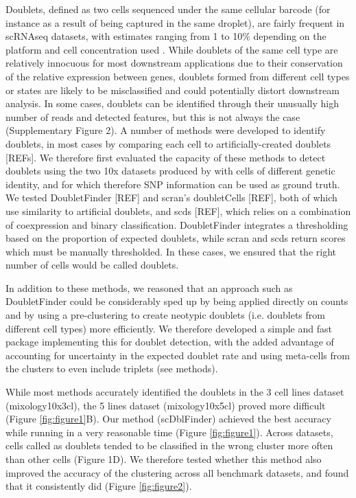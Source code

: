 \documentclass{bmcart}
\begin{document}
Doublets, defined as two cells sequenced under the same cellular barcode (for instance as a result of being captured in the same droplet), are fairly frequent in scRNAseq datasets, with estimates ranging from 1 to 10\% depending on the platform and cell concentration used \citep{bloomEstimating2018,kangMultiplexedDemuxlet2018}. While doublets of the same cell type are relatively innocuous for most downstream applications due to their conservation of the relative expression between genes, doublets formed from different cell types or states are likely to be misclassified and could potentially distort downstream analysis. In some cases, doublets can be identified through their unusually high number of reads and detected features, but this is not always the case (Supplementary Figure 2). A number of methods were developed to identify doublets, in most cases by comparing each cell to artificially-created doublets [REFs]. We therefore first evaluated the capacity of these methods to detect doublets using the two 10x datasets produced by \citep{tianMixology2018} with cells of different genetic identity, and for which therefore SNP information can be used as ground truth. We tested DoubletFinder [REF] and scran's doubletCells [REF], both of which use similarity to artificial doublets, and scds [REF], which relies on a combination of coexpression and binary classification. DoubletFinder integrates a thresholding based on the proportion of expected doublets, while scran and scds return scores which must be manually thresholded. In these cases, we ensured that the right number of cells would be called doublets.

In addition to these methods, we reasoned that an approach such as DoubletFinder could be considerably sped up by being applied directly on counts and by using a pre-clustering to create neotypic doublets (i.e. doublets from different cell types) more efficiently. We therefore developed a simple and fast package implementing this for doublet detection, with the added advantage of accounting for uncertainty in the expected doublet rate and using meta-cells from the clusters to even include triplets (see methods).

While most methods accurately identified the doublets in the 3 cell lines dataset (mixology10x3cl), the 5 lines dataset (mixology10x5cl) proved more difficult (Figure \ref{fig:figure1}B). Our method (scDblFinder) achieved the best accuracy while running in a very reasonable time (Figure \ref{fig:figure1}). Across datasets, cells called as doublets tended to be classified in the wrong cluster more often than other cells (Figure 1D). We therefore tested whether this method also improved the accuracy of the clustering across all benchmark datasets, and found that it consistently did (Figure \ref{fig:figure2}).
\end{document}
